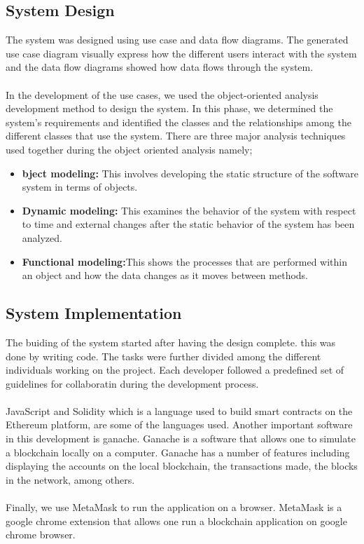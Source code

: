 \subsection{System Design}
The system was designed using use case and data flow diagrams. The generated use case diagram visually express how the different users interact with the system and the data flow diagrams showed how data flows through the system.\\~\\
In the development of the use cases, we used the object-oriented analysis development method to design the system. In this phase, we determined the system’s requirements and identified the classes and the relationships among the different classes that use the system. There are three major analysis techniques used together during the object oriented analysis namely;
\begin{itemize}
\item \textbf{bject modeling:} This involves developing the static structure of the software system in terms of objects. 
\item \textbf{Dynamic modeling:} This examines the behavior of the system with respect to time and external changes after the static behavior of the system has been analyzed.
\item \textbf{Functional modeling:}This shows the processes that are performed within an object and how the data changes as it moves between methods.
\end{itemize}

\subsection{System Implementation}
The buiding of the system started after having the design complete. this was done by writing code. The tasks were further divided among the different individuals working on the project.  Each developer followed a predefined set of guidelines for collaboratin during the development process. \\~\\

JavaScript and Solidity which is a language used to build smart contracts on the Ethereum platform, are some of the languages used.
Another important software in this development is ganache. Ganache is a software that allows one to simulate a blockchain locally on a computer. Ganache has a number of features including displaying the accounts on the local blockchain, the transactions made, the blocks in the network, among others.\\~\\
Finally, we use MetaMask to run the application on a browser. MetaMask is a google chrome extension that allows one run a blockchain application on google chrome browser. 

